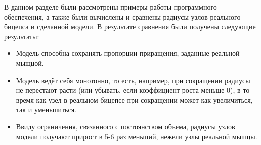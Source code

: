В данном разделе были рассмотрены примеры работы программного обеспечения, а также были вычислены и сравнены радиусы узлов реального бицепса и сделанной модели. В результате сравнения были получены следующие результаты:
\begin{itemize}
    \item Модель способна сохранять пропорции приращения, заданные реальной мыщцой.
    \item Модель ведёт себя монотонно, то есть, например, при сокращении радиусы не перестают расти (или убывать, если коэффициент роста меньше 0), в то время как узел в реальном бицепсе при сокращении может как увеличиться, так и уменьшиться.
    \item Ввиду ограничения, связанного с постоянством объема, радиусы узлов модели получают прирост в 5-6 раз меньший, нежели узлы реальной мышцы.
\end{itemize}

